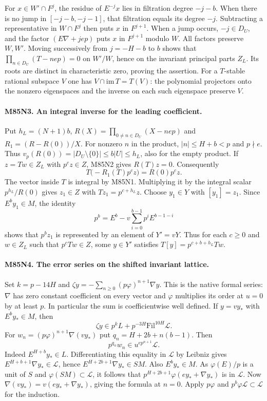 For $x\in W'\cap F^j$, the residue of $E^{-j}x$ lies in
filtration degree $-j-b$. When there is no jump in
$[-j-b,-j-1]$, that filtration equals its degree $-j$.
Subtracting a representative in $W\cap F^j$ then puts $x$ in
$F^{j+1}$. When a jump occurs, $-j\in D_U$, and the factor
$(E\nabla+jep)$ puts $x$ in $F^{j+1}$ modulo $W$.
All factors preserve $W,W'$. Moving successively from
$j=-H-b$ to $b$ shows that
$\prod_{n\in D_U}(T-nep)=0$ on $W'/W$, hence on the invariant
principal parts $Z_L$. Its roots are distinct in characteristic
zero, proving the assertion. For a $T$-stable rational
subspace $V$ one has $V\cap\mathrm{im}\,T=T(V)$: the polynomial
projectors onto the nonzero eigenspaces and the inverse on each
such eigenspace preserve $V$.

\paragraph{M85N3. An integral inverse for the leading coefficient.}
Put $h_L=(N+1)b$, $R(X)=\prod_{0\ne n\in D_U}(X-nep)$ and
$R_1=(R-R(0))/X$. For nonzero $n$ in the product,
$|n|\le H+b<p$ and $p\nmid e$. Thus
$v_p(R(0))=|D_U\setminus\{0\}|\le b|U|\le h_L$,
also for the empty product. If $z=Tw\in Z_L$ with $p^c z\in Z$,
M85N2 gives $R(T)z=0$. Consequently
\[
    T\bigl(-R_1(T)p^c z\bigr)=R(0)p^c z .
\]
The vector inside $T$ is integral by M85N1. Multiplying
it by the integral scalar $p^{h_L}/R(0)$ gives $z_1\in Z$
with $Tz_1=p^{c+h_L}z$. Choose $y_1\in Y$ with $[y_1]=z_1$.
Since $E^b y_1\in M$, the identity
\[
  p^b=E^b-v\sum_{i=0}^{b-1}p^i E^{b-1-i}
\]
shows that $p^b z_1$ is represented by an element of $Y'=vY$.
Thus for each $c\ge0$ and $w\in Z_L$ such that $p^c Tw\in Z$,
some $y\in Y'$ satisfies $T[y]=p^{c+b+h_L}Tw$.

\paragraph{M85N4. The error series on the shifted invariant lattice.}
Set $k=p-14H$ and
$\zeta y=-\sum_{n\ge0}(p\varphi)^{n+1}\nabla y$.
This is the native formal series: $\nabla$ has zero constant
coefficient on every vector and $\varphi$ multiplies its order at
$u=0$ by at least $p$. In particular the sum is coefficientwise
well defined. If $y=v y_*$ with $E^b y_*\in M$, then
\[
       \zeta y\in p^k L+p^{-3H}\mathrm{Fil}^{10H}\mathcal L .
\]
For $w_n=(p\varphi)^{n+1}\nabla(vy_*)$ put
$q_n=H+2b+n(b-1)$. Then
\[
            p^{q_n}w_n\in u^{ep^{n+1}}\mathcal L .
\]
Indeed $E^{H+b}y_*\in L$. Differentiating this equality in
$\mathcal L$ by Leibniz gives
$E^{H+b+1}\nabla y_*\in\mathcal L$, hence
$E^{H+2b+1}\nabla y_*\in SM$. Also $E^b y_*\in M$.
As $\varphi(E)/p$ is a unit of $S$ and $\varphi(SM)\subset
\mathcal L$, it follows that $p^{H+2b+1}\varphi(ey_*+\nabla y_*)$
is in $\mathcal L$. Now $\nabla(vy_*)=v(ey_*+\nabla y_*)$,
giving the formula at $n=0$. Apply $p\varphi$ and
$p^b\varphi\mathcal L\subset\mathcal L$ for the induction.

